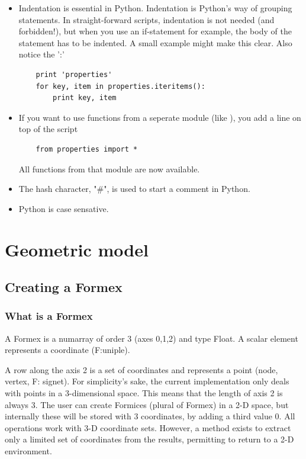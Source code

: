 \documentclass[a4paper]{manual}
\begin{document}
{\begin{itemize}
\begin{itemize}
Simply put: you can either set the arguments in the right order and only give their value, or you can give arguments by their name and value. This last option holds some advantages: not only is it easier to check what you did, but sometimes a function has many arguments with default values and you only want to change a few.
If this isn't entirely clear yet, just look at the examples later in this tutorial or check the Python tutorial.
	\item Indentation is essential in Python. Indentation is Python's way of grouping statements. In straight-forward scripts, indentation is not needed (and forbidden!), but when you use an if-statement for example, the body of the statement has to be indented. A small example might make this clear. Also notice the ':' 
\begin{verbatim}
	print 'properties'
	for key, item in properties.iteritems():
	    print key, item
\end{verbatim}
	\item If you want to use functions from a seperate module (like ), you add a line on top of the script
\begin{verbatim}
	from properties import *
\end{verbatim}
All functions from that module are now available.
	\item The hash character, "\#", is used to start a comment in Python.
	\item Python is case sensative.
	\end{itemize}
\end{itemize}


\section{Geometric model}
\label{sec:geom}


\subsection{Creating a Formex}
\label{subsec:create}

\subsubsection{What is a Formex}
A Formex is a numarray of order 3 (axes 0,1,2) and type Float.
A scalar element represents a coordinate (F:uniple).

    A row along the axis 2 is a set of coordinates and represents a point
    (node, vertex, F: signet).
    For simplicity's sake, the current implementation only deals with points
    in a 3-dimensional space. This means that the length of axis 2 is always 3.
    The user can create Formices (plural of Formex) in a 2-D space, but
    internally these will be stored with 3 coordinates, by adding a third
    value 0. All operations work with 3-D coordinate sets. However, a method
    exists to extract only a limited set of coordinates from the results,
    permitting to return to a 2-D environment.

}
\end{document}
